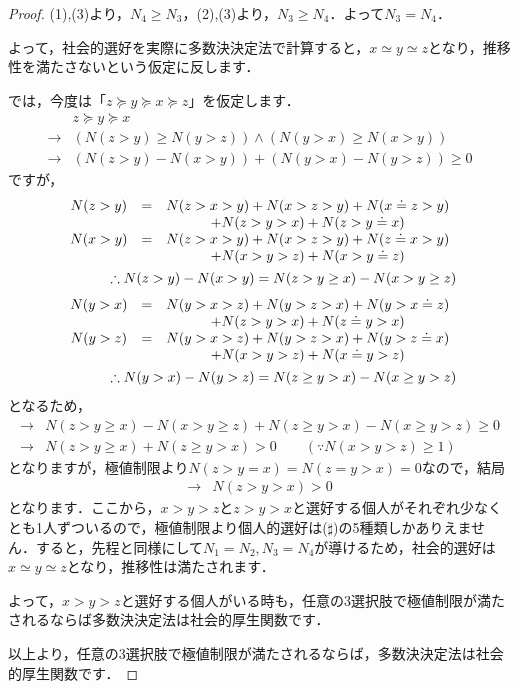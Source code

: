\begin{proof}
(1),(3)より，$N_4 \geq N_3$，(2),(3)より，$N_3 \geq N_4$．よって$N_3 = N_4$．

よって，社会的選好を実際に多数決決定法で計算すると，$x \simeq y \simeq z$となり，推移性を満たさないという仮定に反します．

では，今度は「$z \succeq y \succeq x \succeq z$」を仮定します．
\begin{align*}
        & z \succeq y \succeq x \\
    \to & (N(z > y) \geq N(y > z)) \land (N(y > x) \geq N(x > y)) \\
    \to & (N(z > y) - N(x > y)) + (N(y > x) - N(y > z)) \geq 0
\end{align*}
ですが，
\begin{eqnarray*}
    \begin{array}[h]{ccc}
    N(z > y) &=& N(z > x > y) + N(x > z > y) + N(x \doteq z > y) \\
             & & + N(z > y > x) + N(z > y \doteq x) \\
    N(x > y) &=& N(z > x > y) + N(x > z > y) + N(z \doteq x > y) \\
             & & + N(x > y > z) + N(x > y \doteq z)
    \end{array}\\
    \therefore N(z > y) - N(x > y) = N(z > y \geq x) - N(x > y \geq z)
\end{eqnarray*}
\begin{eqnarray*}
    \begin{array}[h]{ccc}
    N(y > x) &=& N(y > x > z) + N(y > z > x) + N(y > x \doteq z) \\
             & & + N(z > y > x) + N(z \doteq y > x) \\
    N(y > z) &=& N(y > x > z) + N(y > z > x) + N(y > z \doteq x) \\
             & & + N(x > y > z) + N(x \doteq y > z)
    \end{array}\\
    \therefore N(y > x) - N(y > z) = N(z \geq y > x) - N(x \geq y > z)
\end{eqnarray*}
となるため，
\begin{align*}
    \to & N(z > y \geq x) - N(x > y \geq z) + N(z \geq y > x) - N(x \geq y > z) \geq 0 \\
    \to & N(z > y \geq x) + N(z \geq y > x) > 0 \hspace{2em} (\because N(x>y>z)\geq 1)
\end{align*}
となりますが，極値制限より$N(z>y=x)=N(z=y>x)=0$なので，結局
\begin{align*}
    \to & N(z>y>x) > 0
\end{align*}
となります．ここから，$x>y>z$と$z>y>x$と選好する個人がそれぞれ少なくとも1人ずついるので，極値制限より個人的選好は($\sharp$)の5種類しかありえません．すると，先程と同様にして$N_1 = N_2,N_3 = N_4$が導けるため，社会的選好は$x \simeq y \simeq z$となり，推移性は満たされます．

よって，$x>y>z$と選好する個人がいる時も，任意の3選択肢で極値制限が満たされるならば多数決決定法は社会的厚生関数です．

以上より，任意の3選択肢で極値制限が満たされるならば，多数決決定法は社会的厚生関数です．
\end{proof}

